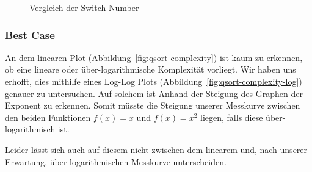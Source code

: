
\begin{figure}[hbt]
    \centering
    \caption{Vergleich der Switch Number}
\end{figure}

\subsubsection{Best Case}\label{subsubsec:qsort-best-case}

An dem linearen Plot (Abbildung~\ref{fig:qsort-complexity})
ist kaum zu erkennen, ob eine lineare oder
über-logarithmische Komplexität vorliegt.
Wir haben uns erhofft, dies mithilfe eines Log-Log Plots
(Abbildung~\ref{fig:qsort-complexity-log}) genauer zu untersuchen.
Auf solchem ist Anhand der Steigung des Graphen der Exponent zu erkennen.
Somit müsste die Steigung unserer Messkurve zwischen den beiden Funktionen
\(f(x)=x\) und \(f(x)=x^2\) liegen, falls diese über-logarithmisch ist.

Leider lässt sich auch auf diesem nicht zwischen dem linearem und, nach
unserer Erwartung, über-logarithmischen Messkurve unterscheiden.

